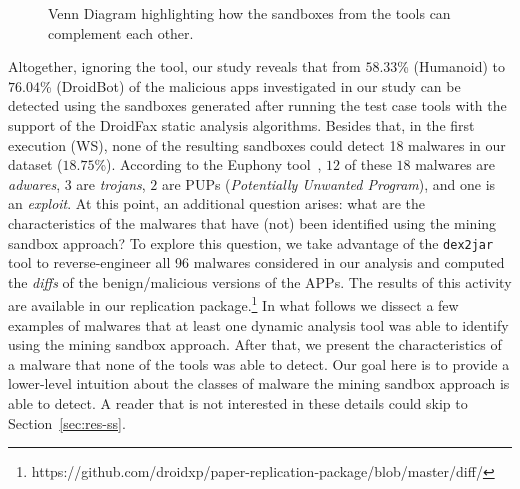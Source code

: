 \begin{figure}[htb]
  \caption{Venn Diagram highlighting how the sandboxes from the tools can
    complement each other.}
  \label{fig:venn-plot1}
\end{figure}


Altogether, ignoring the \joke tool, our study reveals that from $58.33$\% (Humanoid)
to $76.04$\% (DroidBot) of the malicious apps investigated in our study can be
detected using the sandboxes generated after running the test case tools with the support of the
DroidFax static analysis algorithms. Besides that, in the first execution (WS), none of the
resulting sandboxes could detect 18 malwares in our dataset ($18.75$\%). According to
the Euphony tool~\cite{hurier2017euphony}, $12$ of these $18$ malwares are \emph{adwares}, $3$ are \emph{trojans}, $2$ are
PUPs (\emph{Potentially Unwanted Program}), and one is an \emph{exploit}.
At this point, an additional question arises: what are the characteristics
of the malwares that have (not) been identified using the mining sandbox approach?
To explore this question, we take advantage of the
\texttt{dex2jar} tool to reverse-engineer all 96 malwares considered in our analysis and
computed the \emph{diffs} of the benign/malicious versions of the APPs.
The results of this activity are available in our replication
package.\footnote{https://github.com/droidxp/paper-replication-package/blob/master/diff/} 
In what follows we dissect a few examples of malwares
that at least one dynamic analysis tool was able to
identify using the mining sandbox approach. After that,
we present the characteristics of a malware that none of the tools
was able to detect. Our goal here is to provide
a lower-level intuition about the classes of malware the
mining sandbox approach is able to detect. A reader that
is not interested in these details could skip to
Section~\ref{sec:res-ss}.

